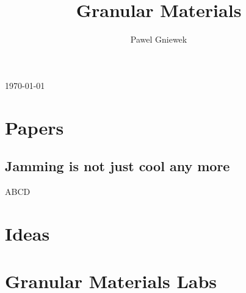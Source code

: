 \documentclass[10pt,a4paper]{article}
\begin{document}
\begin{center}
\title{ \bf Granular Materials }
\author{ Pawel Gniewek }
\maketitle

\newpage
\vspace{0.5cm}
\today
\tableofcontents
\end{center}

\newpage

\section{Papers}
\subsection{Jamming is not just cool any more\cite{nagel:98}}
ABCD
 
\section{Ideas}

\section{Granular Materials Labs}


\thispagestyle{empty} %




\clearpage
\end{document}
